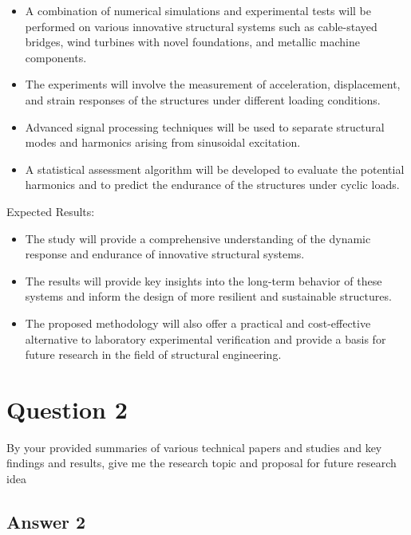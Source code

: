 \documentclass[
  letterpaper,
  DIV=11,
  numbers=noendperiod]{scrreprt}
\providecommand{\tightlist}{%
  \setlength{\itemsep}{0pt}\setlength{\parskip}{0pt}}\usepackage{longtable,booktabs,array}
\begin{document}
\begin{itemize}
\tightlist
\item
  A combination of numerical simulations and experimental tests will be
  performed on various innovative structural systems such as
  cable-stayed bridges, wind turbines with novel foundations, and
  metallic machine components.
\item
  The experiments will involve the measurement of acceleration,
  displacement, and strain responses of the structures under different
  loading conditions.
\item
  Advanced signal processing techniques will be used to separate
  structural modes and harmonics arising from sinusoidal excitation.
\item
  A statistical assessment algorithm will be developed to evaluate the
  potential harmonics and to predict the endurance of the structures
  under cyclic loads.
\end{itemize}

Expected Results:

\begin{itemize}
\tightlist
\item
  The study will provide a comprehensive understanding of the dynamic
  response and endurance of innovative structural systems.
\item
  The results will provide key insights into the long-term behavior of
  these systems and inform the design of more resilient and sustainable
  structures.
\item
  The proposed methodology will also offer a practical and
  cost-effective alternative to laboratory experimental verification and
  provide a basis for future research in the field of structural
  engineering.
\end{itemize}

\hypertarget{question-2}{%
\section{Question 2}\label{question-2}}

By your provided summaries of various technical papers and studies and
key findings and results, give me the research topic and proposal for
future research idea

\hypertarget{answer-2}{%
\subsection{Answer 2}\label{answer-2}}
\end{document}
